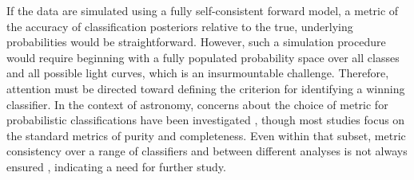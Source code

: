 If the data are simulated using a fully self-consistent forward model, a metric of the accuracy of classification posteriors relative to the true, underlying probabilities would be straightforward.
However, such a simulation procedure would require beginning with a fully populated probability space over all classes and all possible light curves, which is an insurmountable challenge.
Therefore, attention must be directed toward defining the criterion for identifying a winning classifier.
In the context of astronomy, concerns about the choice of metric for probabilistic classifications have been investigated \citep{kim_stargalaxy_2017, florios_forecasting_2018}, though most studies focus on the standard metrics of purity and completeness.
Even within that subset, metric consistency over a range of classifiers and between different analyses is not always ensured \citep{bethapudi_separation_2018}, indicating a need for further study.

